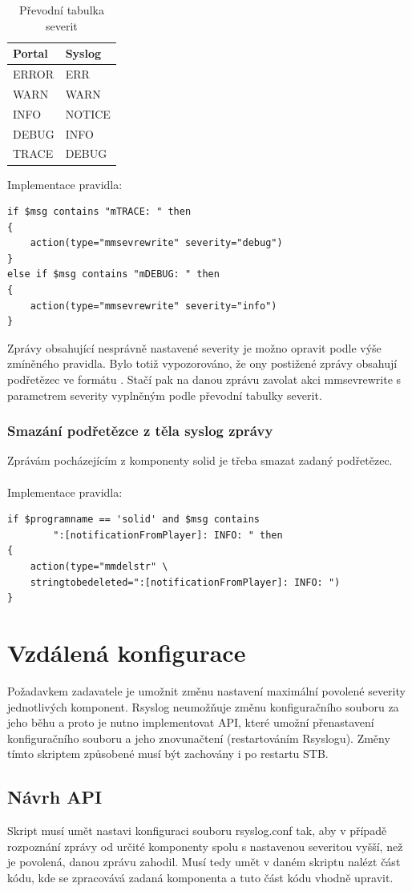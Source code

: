 \documentclass[thesis=B,czech]{FITthesis}[2012/06/26]
\begin{document}
\begin{table}[H]
\centering
	\caption{Převodní tabulka severit}	\begin{tabular}{|l|l|}\hline
		Portal		& Syslog			\tabularnewline \hline \hline
		ERROR		& ERR			\tabularnewline \hline
		WARN		& WARN			\tabularnewline \hline
		INFO		& NOTICE			\tabularnewline \hline
		DEBUG		& INFO			\tabularnewline \hline
		TRACE		& DEBUG			\tabularnewline \hline
	\end{tabular}
\end{table}
Implementace pravidla:
\begin{lstlisting}[style=RainerScriptStyle]
if $msg contains "mTRACE: " then
{
	action(type="mmsevrewrite" severity="debug")
}
else if $msg contains "mDEBUG: " then
{
	action(type="mmsevrewrite" severity="info")
}
\end{lstlisting}
Zprávy obsahující nesprávně nastavené severity je možno opravit podle výše zmíněného pravidla. Bylo totiž vypozorováno, že ony postižené zprávy obsahují podřetězec ve formátu . Stačí pak na danou zprávu zavolat akci mmsevrewrite s parametrem severity vyplněným podle převodní tabulky severit.

\subsubsection{Smazání podřetězce z těla syslog zprávy}
Zprávám pocházejícím z komponenty solid je třeba smazat zadaný podřetězec.
\\
\\
Implementace pravidla:
\begin{lstlisting}[style=RainerScriptStyle]
if $programname == 'solid' and $msg contains
		":[notificationFromPlayer]: INFO: " then
{
	action(type="mmdelstr" \ 
	stringtobedeleted=":[notificationFromPlayer]: INFO: ")
}
\end{lstlisting}


\section{Vzdálená konfigurace}
Požadavkem zadavatele je umožnit změnu nastavení maximální povolené severity jednotlivých komponent. Rsyslog neumožňuje změnu konfiguračního souboru za jeho běhu a proto je nutno implementovat API, které umožní přenastavení konfiguračního souboru a jeho znovunačtení (restartováním Rsyslogu).
Změny tímto skriptem způsobené musí být zachovány i po restartu STB.

\subsection{Návrh API}
Skript musí umět nastavi konfiguraci souboru rsyslog.conf tak, aby v případě rozpoznání zprávy od určité komponenty spolu s nastavenou severitou vyšší, než je povolená, danou zprávu zahodil. 
Musí tedy umět v daném skriptu nalézt část kódu, kde se zpracovává zadaná komponenta a tuto část kódu vhodně upravit.
\end{document}
